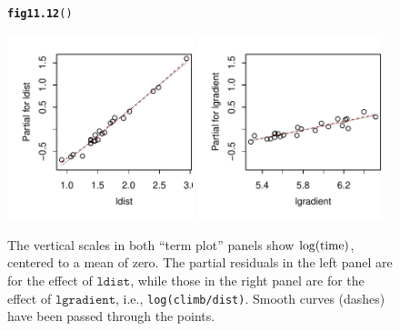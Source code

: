 \documentclass[12pt, a4paper,  BCOR=8.25mm, DIV=15]{scrartcl}\usepackage[]{graphicx}\usepackage[]{color}
\makeatletter
\newcommand{\hlstd}[1]{\textcolor[rgb]{0.345,0.345,0.345}{#1}}%
\newcommand{\hlkwd}[1]{\textcolor[rgb]{0.737,0.353,0.396}{\textbf{#1}}}%
\newenvironment{kframe}{%
 \def\at@end@of@kframe{}%
 \ifinner\ifhmode%
  \def\at@end@of@kframe{\end{minipage}}%
  \begin{minipage}{\columnwidth}%
 \fi\fi%
 \def\FrameCommand##1{\hskip\@totalleftmargin \hskip-\fboxsep
 \colorbox{shadecolor}{##1}\hskip-\fboxsep
     \hskip-\linewidth \hskip-\@totalleftmargin \hskip\columnwidth}%
 \MakeFramed {\advance\hsize-\width
   \@totalleftmargin\z@ \linewidth\hsize
   \@setminipage}}%
 {\par\unskip\endMakeFramed%
 \at@end@of@kframe}
\newenvironment{knitrout}{}{} %
\newcommand{\txtt}[1]{{\texttt{#1}}}
\makeatother
\begin{document}
\begin{figure}[H]
\begin{knitrout}
\color{fgcolor}\begin{kframe}
\begin{alltt}
\hlkwd{fig11.12}\hlstd{()}
\end{alltt}
\end{kframe}

{\centering \includegraphics[width=0.48\textwidth]{figs/reg-tplot-ni-11_12-1} 
\includegraphics[width=0.48\textwidth]{figs/reg-tplot-ni-11_12-2} 

}



\end{knitrout}
\caption{The vertical scales in both ``term plot'' panels show
  $\log(\rm{time})$, centered to a mean of zero. The partial residuals
  in the left panel are for the effect of $\txtt{ldist}$, while those
  in the right panel are for the effect of $\txtt{lgradient}$, i.e.,
  \txtt{log(climb/dist)}. Smooth curves (dashes) have been passed
  through the points.\label{fig:lnihills-lin}}
\vspace*{-15pt}
\end{figure}
\end{document}
